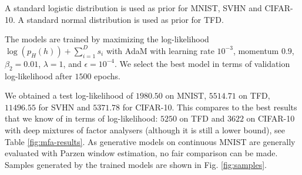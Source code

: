 \documentclass{article}
\begin{document}
A standard logistic
distribution is used as prior for MNIST, SVHN and CIFAR-10. A standard normal distribution is used as prior for TFD.

The models are trained by maximizing the log-likelihood $\log(p_{H}(h)) + \sum_{i=1}^{D}{s_{i}}$ with AdaM \citep{kingma2014adam} with
learning rate $10^{-3}$, momentum $0.9$, $\beta_{2} = 0.01$,
$\lambda = 1$, and $\epsilon = 10^{-4}$. We select the best model in terms of 
validation log-likelihood after $1500$ epochs.
%

We obtained a test log-likelihood of $1980.50$ on MNIST, $5514.71$ on TFD,
$11496.55$ for SVHN and $5371.78$ for CIFAR-10. This compares to the best
results that we know of in terms of log-likelihood: $5250$ on TFD and $3622$
on CIFAR-10 with deep mixtures of factor analysers \citep{tang2012deep} (although it is still a lower bound), see Table
\ref{fig:mfa-results}.
As generative models on continuous MNIST are generally evaluated with
Parzen window estimation, no fair comparison can be made.
Samples generated by the trained models are shown in Fig. \ref{fig:samples}.
\end{document}
